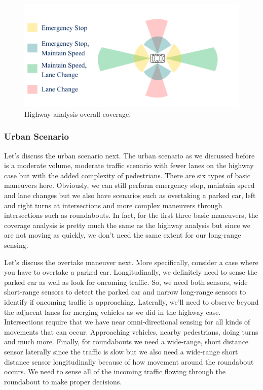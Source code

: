 \begin{figure}[!htb]
\begin{center}
\includegraphics[scale=0.280]{img/hardware/highway_analysis_overall_coverage.jpeg}
\end{center}
\caption{Highway analysis overall coverage.}
\label{highway_analysis_overall_coverage}
\end{figure}

\subsubsection{Urban Scenario}
\label{urban_scenario}

Let's discuss the urban scenario next. 
The urban scenario as we discussed before is a moderate volume, moderate traffic scenario with fewer lanes on the highway case but with the added complexity of pedestrians. 
There are six types of basic maneuvers here. Obviously, we can still perform emergency stop, maintain speed and lane changes but we also have scenarios such as overtaking a parked car, 
left and right turns at intersections and more complex maneuvers through intersections such as roundabouts. 
In fact, for the first three basic maneuvers, the coverage analysis is pretty much the same as the highway analysis but since we are not moving as quickly, 
we don't need the same extent for our long-range sensing. 

Let's discuss the overtake maneuver next. 
More specifically, consider a case where you have to overtake a parked car. 
Longitudinally, we definitely need to sense the parked car as well as look for oncoming traffic. 
So, we need both sensors, wide short-range sensors to detect the parked car and narrow long-range sensors to identify if oncoming traffic is approaching. 
Laterally, we'll need to observe beyond the adjacent lanes for merging vehicles as we did in the highway case. 
Intersections require that  we  have near omni-directional sensing for all kinds of movements that can occur. 
Approaching vehicles, nearby pedestrians, doing turns and much more. 
Finally, for roundabouts we need a wide-range, short distance sensor laterally since the traffic is slow but 
we also need a wide-range short distance sensor longitudinally because of how movement around the roundabout occurs. 
We need to sense all of the incoming traffic flowing through the roundabout to make proper decisions. 

